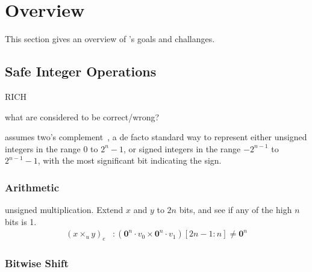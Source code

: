 \section{Overview}
\label{s:oview}

This section gives an overview of \sys's goals and challanges.

\subsection{Safe Integer Operations}

\newcommand{\zeros}[1]{\mathbf{0}^{#1}}
\newcommand{\ones}[1]{\mathbf{1}^{#1}}
\newcommand{\concat}{\cdot}

\newcommand{\smin}{\mathrm{smin}}
\newcommand{\smax}{\mathrm{smax}}
\newcommand{\umax}{\mathrm{umax}}

\newcommand{\sadde}{\mathtt{sadd}_e}
\newcommand{\uadde}{\mathtt{uadd}_e}
\newcommand{\ssube}{\mathtt{ssub}_e}
\newcommand{\usube}{\mathtt{usub}_e}
\newcommand{\smule}{\mathtt{smul}_e}
\newcommand{\umule}[2]{(#1 \times_u #2)_e}
\newcommand{\sdive}{\mathtt{sdiv}_e}
\newcommand{\udive}{\mathtt{udiv}_e}
\newcommand{\shle}[2]{(#1 \ll #2)_e}
\newcommand{\shre}[2]{(#1 \gg #2)_e}
\newcommand{\conve}{\mathtt{conv}_e}

RICH~\cite{brumley:rich}

what are considered to be correct/wrong?

\sys assumes two's complement~\cite{intel:int}, a de facto
standard way to represent either unsigned integers in the range $0$
to $2^n-1$, or signed integers in the range $-2^{n-1}$ to $2^{n-1}-1$,
with the most significant bit indicating the sign.

\subsubsection*{Arithmetic}

unsigned multiplication.
Extend $x$ and $y$ to $2n$ bits, and see if any of the high $n$ bits is 1.
\begin{align}
\umule{x}{y}&: %
(\zeros{n}\concat v_0 \times \zeros{n}\concat v_1)[2n-1:n] \neq \zeros{n}
\end{align}



\subsubsection*{Bitwise Shift}

